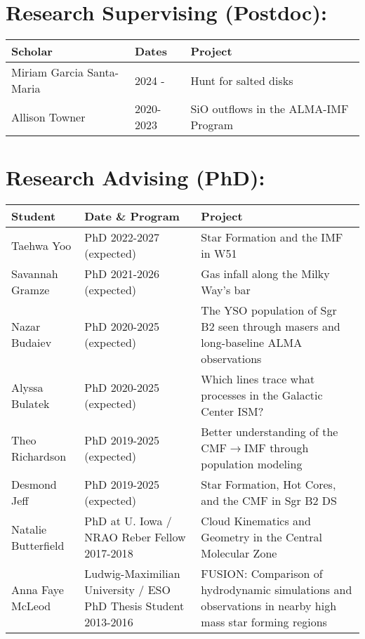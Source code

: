 \vspace{0.5cm}

\begin{minipage}{\textwidth}
\setlength{\extrarowheight}{4pt}
\section*{Research Supervising (Postdoc): }
\vspace{-12pt}
\begin{tabular}{lp{2.1in}p{2.6in}}
    Scholar & Dates  &   Project \\
    \hline
    Miriam Garcia Santa-Maria &  2024 -     & Hunt for salted disks \\
    Allison Towner            &  2020-2023  & SiO outflows in the ALMA-IMF Program \\
\end{tabular}
\end{minipage}

\vspace{0.5cm}

\begin{minipage}{\textwidth}
\setlength{\extrarowheight}{4pt}
\section*{Research Advising (PhD): }
\vspace{-12pt}
\begin{tabular}{lp{2.1in}p{2.6in}}
    Student & Date  \& Program &   Project \\
    \hline
    Taehwa Yoo          &  PhD 2022-2027 (expected) & Star Formation and the IMF in W51 \\
    Savannah Gramze     &  PhD 2021-2026 (expected) &                                     Gas infall along the Milky Way's bar \\
    Nazar Budaiev       &  PhD 2020-2025 (expected) &                                    The YSO population of Sgr B2 seen through masers and long-baseline ALMA observations  \\
    Alyssa Bulatek      &  PhD 2020-2025 (expected) &                                    Which lines trace what processes in the Galactic Center ISM?  \\
    Theo Richardson     &  PhD 2019-2025 (expected)  &                                   Better understanding of the CMF$\rightarrow$IMF through population modeling  \\
    Desmond Jeff        &  PhD 2019-2025 (expected)  &                                    Star Formation, Hot Cores, and the CMF in Sgr B2 DS \\
    Natalie Butterfield &  PhD at U. Iowa / NRAO Reber Fellow 2017-2018   &                     Cloud Kinematics and Geometry in the Central Molecular Zone \\
    Anna Faye McLeod    &  Ludwig-Maximilian University / ESO PhD Thesis Student 2013-2016  &  FUSION: Comparison of hydrodynamic simulations and observations in nearby high mass star forming regions  \\
\end{tabular}
\end{minipage}


